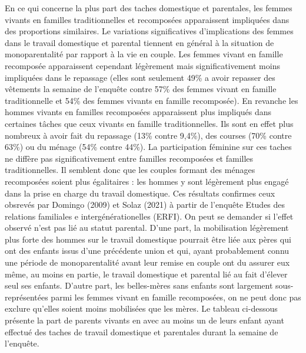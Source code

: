 \documentclass[
  12pt,
]{book}
\begin{document}
En ce qui concerne la plus part des taches domestique et parentales, les
femmes vivants en familles traditionnelles et recomposées apparaissent
impliquées dans des proportions similaires. Le variations significatives
d'implications des femmes dans le travail domestique et parental
tiennent en général à la situation de monoparentalité par rapport à la
vie en couple. Les femmes vivant en famille recomposée apparaissent
cependant légèrement mais significativement moins impliquées dans le
repassage (elles sont seulement 49\% a avoir repasser des vêtements la
semaine de l'enquête contre 57\% des femmes vivant en famille
traditionnelle et 54\% des femmes vivants en famille recomposée). En
revanche les hommes vivants en familles recomposées apparaissent plus
impliqués dans certaines tâches que ceux vivants en famille
traditionnelles. Ils sont en effet plus nombreux à avoir fait du
repassage (13\% contre 9,4\%), des courses (70\% contre 63\%) ou du
ménage (54\% contre 44\%). La participation féminine sur ces taches ne
diffère pas significativement entre familles recomposées et familles
traditionnelles. Il semblent donc que les couples formant des ménages
recomposées soient plus égalitaires : les hommes y sont légèrement plus
engagé dans la prise en charge du travail domestique. Ces résultats
confirmes ceux obsrevés par Domingo (2009) et Solaz (2021) à partir de
l'enquête Etudes des relations familiales e intergénérationelles (ERFI).
On peut se demander si l'effet observé n'est pas lié au statut parental.
D'une part, la mobilisation légèrement plus forte des hommes sur le
travail domestique pourrait être liée aux pères qui ont des enfants
issus d'une précédente union et qui, ayant probablement connu une
période de monoparentalité avant leur remise en couple ont du assurer
eux même, au moins en partie, le travail domestique et parental lié au
fait d'élever seul ses enfants. D'autre part, les belles-mères sans
enfants sont largement sous-représentées parmi les femmes vivant en
famille recomposées, on ne peut donc pas exclure qu'elles soient moins
mobilisées que les mères. Le tableau ci-dessous présente la part de
parents vivants en avec au moins un de leurs enfant ayant effectué des
taches de travail domestique et parentales durant la semaine de
l'enquête.

\begingroup\fontsize{7}{9}\selectfont
\begingroup\fontsize{8}{10}\selectfont
\end{document}
